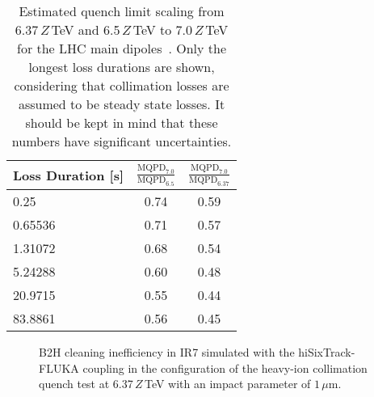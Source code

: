 \begin{table}[htbp]
\centering
\caption{Estimated quench limit scaling from 6.37$\,Z\,$TeV and 6.5$\,Z\,$TeV to 7.0$\,Z\,$TeV for the LHC main dipoles~\cite{vervej:private}.  Only the longest loss durations are shown, considering that collimation losses are assumed to be steady state losses. It should be kept in mind that these numbers have significant uncertainties.}
\label{tab:ql:est}

\begin{tabular}{lcc}
\toprule
Loss Duration [s]  &  $\frac{\text{MQPD}_{7.0}}{\text{MQPD}_{6.5}}$ & $\frac{\text{MQPD}_{7.0}}{\text{MQPD}_{6.37}}$    \\ \midrule
0.25    & 0.74 & 0.59 \\
0.65536 & 0.71 & 0.57 \\
1.31072 & 0.68 & 0.54 \\
5.24288 & 0.60 & 0.48 \\
20.9715 & 0.55 & 0.44 \\
83.8861 & 0.56 & 0.45 \\ \bottomrule
\end{tabular}
\end{table}



\begin{figure}[htbp]
  \centering
  \caption{B2H cleaning inefficiency in IR7 simulated with the hiSixTrack-FLUKA coupling in the configuration of the heavy-ion collimation quench test at 6.37$\,Z\,$TeV with an impact parameter of $1\,\mu$m. }  
  \label{pic:16090907}
  \end{figure}


